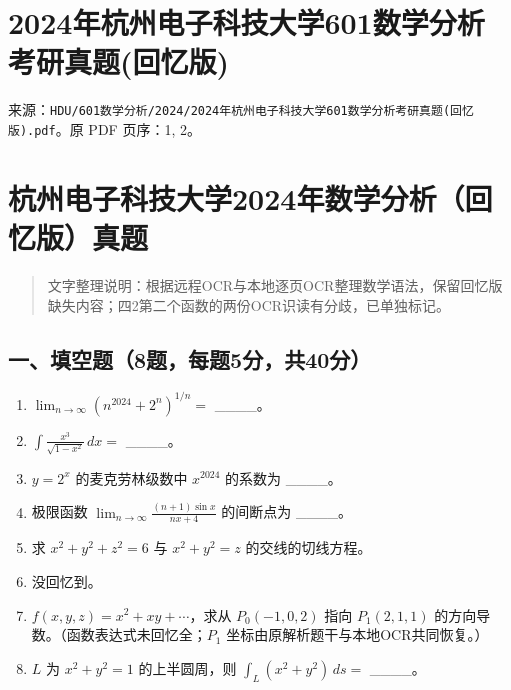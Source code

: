 \documentclass[11pt,fontset=fandol]{ctexart}
\begin{document}
\section{2024年杭州电子科技大学601数学分析考研真题(回忆版)}\label{ux5e74ux676dux5ddeux7535ux5b50ux79d1ux6280ux5927ux5b66601ux6570ux5b66ux5206ux6790ux8003ux7814ux771fux9898ux56deux5fc6ux7248}

来源：\texttt{HDU/601数学分析/2024/2024年杭州电子科技大学601数学分析考研真题(回忆版).pdf}。原
PDF 页序：1, 2。

\section{杭州电子科技大学2024年数学分析（回忆版）真题}\label{ux676dux5ddeux7535ux5b50ux79d1ux6280ux5927ux5b662024ux5e74ux6570ux5b66ux5206ux6790ux56deux5fc6ux7248ux771fux9898}

\begin{quote}
文字整理说明：根据远程OCR与本地逐页OCR整理数学语法，保留回忆版缺失内容；四2第二个函数的两份OCR识读有分歧，已单独标记。
\end{quote}

\subsection{一、填空题（8题，每题5分，共40分）}\label{ux4e00ux586bux7a7aux98988ux9898ux6bcfux98985ux5206ux517140ux5206}

\begin{enumerate}
\def\labelenumi{\arabic{enumi}.}
\item
  \(\displaystyle\lim_{n\to\infty}(n^{2024}+2^n)^{1/n}=\) \_\_\_\_。
\item
  \(\displaystyle\int\frac{x^3}{\sqrt{1-x^2}}\,dx=\) \_\_\_\_。
\item
  \(y=2^x\) 的麦克劳林级数中 \(x^{2024}\) 的系数为 \_\_\_\_。
\item
  极限函数 \(\displaystyle\lim_{n\to\infty}\frac{(n+1)\sin x}{nx+4}\)
  的间断点为 \_\_\_\_。
\item
  求 \(x^2+y^2+z^2=6\) 与 \(x^2+y^2=z\) 的交线的切线方程。
\item
  没回忆到。
\item
  \(f(x,y,z)=x^2+xy+\cdots\)，求从 \(P_0(-1,0,2)\) 指向 \(P_1(2,1,1)\)
  的方向导数。（函数表达式未回忆全；\(P_1\)
  坐标由原解析题干与本地OCR共同恢复。）
\item
  \(L\) 为 \(x^2+y^2=1\) 的上半圆周，则
  \(\displaystyle\int_L(x^2+y^2)\,ds=\) \_\_\_\_。
\end{enumerate}
\end{document}
